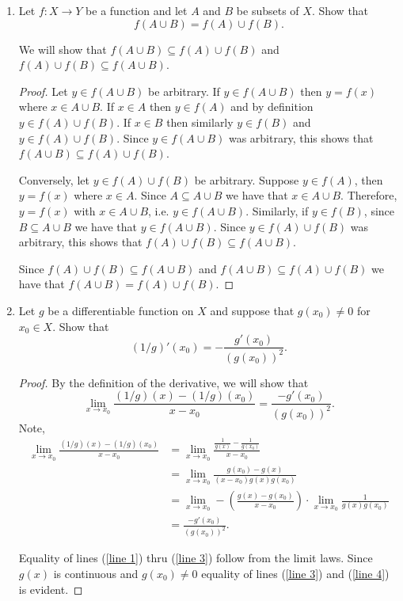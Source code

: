 \documentclass{article}
\begin{document}
\begin{enumerate}[1)]
\item Let $f:X\rightarrow Y$ be a function and let $A$ and $B$ be subsets of $X$. Show that 
\[f(A\cup B)=f(A)\cup f(B).\]

We will show that $f(A\cup B)\subseteq f(A)\cup f(B)$ and $f(A)\cup f(B)\subseteq f(A\cup B)$.

\begin{proof}
Let $y\in f(A\cup B)$ be arbitrary. If $y\in f(A\cup B)$ then $y=f(x)$ where $x\in A\cup B$. If $x\in A$ then $y\in f(A)$ and by definition $y\in f(A)\cup f(B)$. If $x\in B$ then similarly $y\in f(B)$ and $y\in f(A)\cup f(B)$. Since $y\in f(A\cup B)$ was arbitrary, this shows that $f(A\cup B)\subseteq f(A)\cup f(B)$. 

Conversely, let $y\in f(A)\cup f(B)$ be arbitrary. Suppose $y\in f(A)$, then $y=f(x)$ where $x\in A$. Since $A\subseteq A\cup B$ we have that $x\in A\cup B$. Therefore, $y=f(x)$ with $x\in A\cup B$, i.e. $y\in f(A\cup B)$. Similarly, if $y\in f(B)$, since $B\subseteq A\cup B$ we have that $y\in f(A\cup B)$. Since $y\in f(A)\cup f(B)$ was arbitrary, this shows that $f(A)\cup f(B)\subseteq f(A\cup B)$. 

Since $f(A)\cup f(B)\subseteq f(A\cup B)$ and $f(A\cup B)\subseteq f(A)\cup f(B)$ we have that $f(A\cup B)=f(A)\cup f(B)$.
\end{proof}


\item Let $g$ be a differentiable function on $X$ and suppose that $g(x_0)\neq 0$ for $x_0\in X$. Show that 
\[(1/g)'(x_0)=-\frac{g'(x_0)}{(g(x_0))^2}.\]

\begin{proof} By the definition of the derivative, we will show that 
\[\lim_{x\rightarrow x_0} \frac{(1/g)(x)-(1/g)(x_0)}{x-x_0}= \frac{-g'(x_0)}{(g(x_0))^2}.\]
Note, 
\begin{align}
    \lim_{x\rightarrow x_0} \frac{(1/g)(x)-(1/g)(x_0)}{x-x_0}
    &=\lim_{x\rightarrow x_0}\frac{\frac{1}{g(x)}-\frac{1}{g(x_0)}}{x-x_0}\label{line 1} \\
    &=\lim_{x\rightarrow x_0}\frac{g(x_0)-g(x)}{(x-x_0)g(x)g(x_0)}\label{line 2}\\
    &=\lim_{x\rightarrow x_0}-\left(\frac{g(x)-g(x_0)}{x-x_0}\right)\cdot \lim_{x\rightarrow x_0}\frac{1}{g(x)g(x_0)}\label{line 3}\\
    &=\frac{-g'(x_0)}{(g(x_0))^2}\label{line 4}.
\end{align}

Equality of lines (\ref{line 1}) thru (\ref{line 3}) follow from the limit laws. Since $g(x)$ is continuous and $g(x_0)\neq 0$ equality of lines (\ref{line 3}) and (\ref{line 4}) is evident. 



\end{proof}

\end{enumerate}
\end{document}
